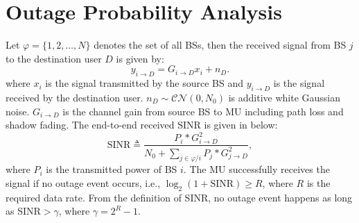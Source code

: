  \section{Outage Probability Analysis}
 \label{OutageProb}
 \par Let $\varphi = \{1, 2, \dots, N\}$ denotes the set of all BSs, then the received signal from BS $j$ to the destination user $D$ is given by:
 \begin{equation}
 y_{i\to D} = G_{i\to D}x_{i}+n_{D}.
 \end{equation}
 where $x_{i}$ is the signal transmitted by the source BS and $y_{i\to D}$ is the signal received by the destination user. $n_{D}\sim \mathcal{CN}(0,N_{0})$ is additive white Gaussian noise. $G_{i\to D}$ is the channel gain from source BS to MU including path loss and shadow fading. The end-to-end received $\text{SINR}$ is given in below:
 \begin{equation}
 \text{SINR} \triangleq \frac{P_{i}*G_{i\to D}^{2}}{N_{0}+\sum_{j\in \varphi/i}P_{j}*G_{j\to D}^2},
 \end{equation}
 where $P_{i}$ is the transmitted power of BS $i$. The MU successfully receives the signal if no outage event occurs, i.e., $\log_{2}(1+\text{SINR})\ge R$, where $R$ is the required data rate. From the definition of SINR, no outage event happens as long as $\text{SINR} > \gamma$, where $\gamma = 2^{R}-1$.

